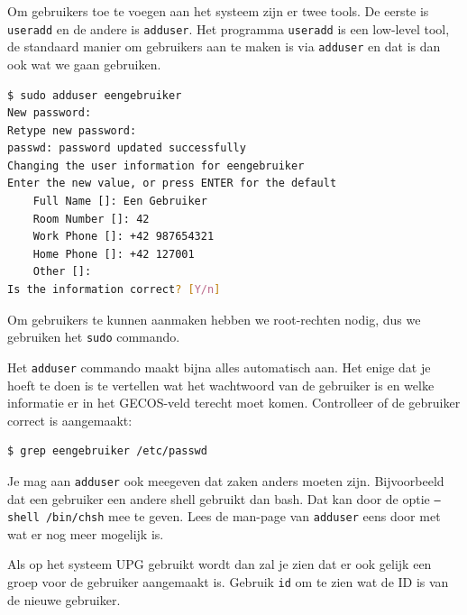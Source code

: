 Om gebruikers toe te voegen aan het systeem zijn er twee tools. De eerste is \texttt{useradd} en de andere is \texttt{adduser}. Het programma \texttt{useradd} is een low-level tool, de standaard manier om gebruikers aan te maken is via \texttt{adduser} en dat is dan ook wat we gaan gebruiken.

\begin{lstlisting}[language=bash]
$ sudo adduser eengebruiker
New password: 
Retype new password: 
passwd: password updated successfully
Changing the user information for eengebruiker
Enter the new value, or press ENTER for the default
	Full Name []: Een Gebruiker
	Room Number []: 42
	Work Phone []: +42 987654321
	Home Phone []: +42 127001
	Other []: 
Is the information correct? [Y/n]
\end{lstlisting}
Om gebruikers te kunnen aanmaken hebben we root-rechten nodig, dus we gebruiken het \texttt{sudo} commando.

Het \texttt{adduser} commando maakt bijna alles automatisch aan. Het enige dat je hoeft te doen is te vertellen wat het wachtwoord van de gebruiker is en welke informatie er in het GECOS-veld terecht moet komen. Controlleer of de gebruiker correct is aangemaakt:
\begin{lstlisting}[language=bash]
$ grep eengebruiker /etc/passwd
\end{lstlisting}

Je mag aan \texttt{adduser} ook meegeven dat zaken anders moeten zijn. Bijvoorbeeld dat een gebruiker een andere shell gebruikt dan bash. Dat kan door de optie \texttt{--shell /bin/chsh} mee te geven. Lees de man-page van \texttt{adduser} eens door met wat er nog meer mogelijk is.

Als op het systeem UPG gebruikt wordt dan zal je zien dat er ook gelijk een groep voor de gebruiker aangemaakt is. Gebruik \texttt{id} om te zien wat de ID is van de nieuwe gebruiker.

